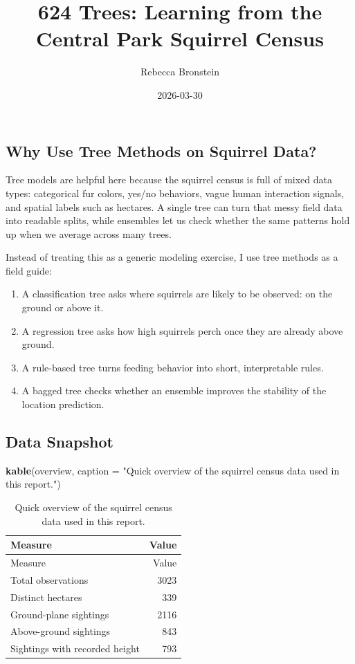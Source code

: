 \documentclass[
  11pt,
]{article}
\title{624 Trees: Learning from the Central Park Squirrel Census}
\author{Rebecca Bronstein}
\date{2026-03-30}
\newenvironment{Shaded}{\begin{snugshade}}{\end{snugshade}}
\newcommand{\AttributeTok}[1]{\textcolor[rgb]{0.13,0.29,0.53}{#1}}
\newcommand{\FunctionTok}[1]{\textcolor[rgb]{0.13,0.29,0.53}{\textbf{#1}}}
\newcommand{\NormalTok}[1]{#1}
\newcommand{\StringTok}[1]{\textcolor[rgb]{0.31,0.60,0.02}{#1}}
\providecommand{\tightlist}{%
  \setlength{\itemsep}{0pt}\setlength{\parskip}{0pt}}
\begin{document}
\maketitle

{
\setcounter{tocdepth}{2}
\tableofcontents
}
\subsection{Why Use Tree Methods on Squirrel
Data?}\label{why-use-tree-methods-on-squirrel-data}

Tree models are helpful here because the squirrel census is full of
mixed data types: categorical fur colors, yes/no behaviors, vague human
interaction signals, and spatial labels such as hectares. A single tree
can turn that messy field data into readable splits, while ensembles let
us check whether the same patterns hold up when we average across many
trees.

Instead of treating this as a generic modeling exercise, I use tree
methods as a field guide:

\begin{enumerate}
\def\labelenumi{\arabic{enumi}.}
\tightlist
\item
  A classification tree asks where squirrels are likely to be observed:
  on the ground or above it.
\item
  A regression tree asks how high squirrels perch once they are already
  above ground.
\item
  A rule-based tree turns feeding behavior into short, interpretable
  rules.
\item
  A bagged tree checks whether an ensemble improves the stability of the
  location prediction.
\end{enumerate}

\subsection{Data Snapshot}\label{data-snapshot}

\begin{Shaded}
\begin{Highlighting}[]
\FunctionTok{kable}\NormalTok{(overview, }\AttributeTok{caption =} \StringTok{"Quick overview of the squirrel census data used in this report."}\NormalTok{)}
\end{Highlighting}
\end{Shaded}

\begin{longtable}[]{@{}lr@{}}
\caption{Quick overview of the squirrel census data used in this
report.}\tabularnewline
\toprule\noalign{}
Measure & Value \\
\midrule\noalign{}
\endfirsthead
\toprule\noalign{}
Measure & Value \\
\midrule\noalign{}
\endhead
\bottomrule\noalign{}
\endlastfoot
Total observations & 3023 \\
Distinct hectares & 339 \\
Ground-plane sightings & 2116 \\
Above-ground sightings & 843 \\
Sightings with recorded height & 793 \\
\end{longtable}
\end{document}
